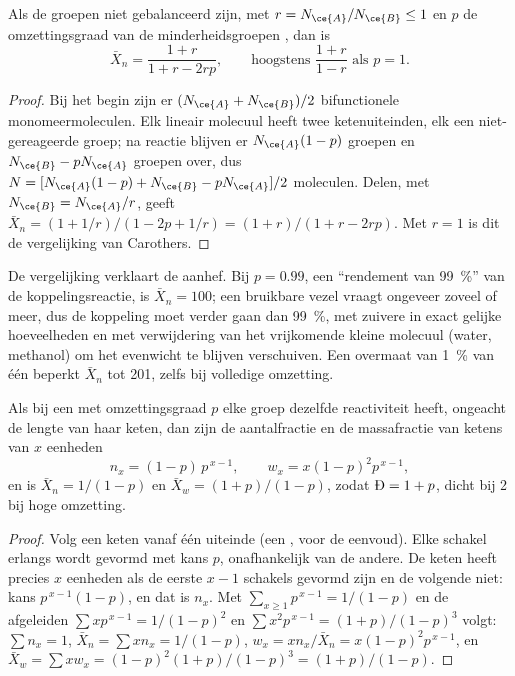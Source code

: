 \begin{corollary}[Onbalans]\label{cor:b2:polymer-synthesis:imbalance}
Als de groepen niet gebalanceerd zijn, met $r = N_{\ce{A}}/N_{\ce{B}} \le 1$ en $p$ de omzettingsgraad van
de minderheidsgroepen , dan is
\begin{equation*}
\bar X_n = \frac{1 + r}{1 + r - 2rp}, \qquad \text{hoogstens } \frac{1+r}{1-r} \text{ als } p = 1.
\end{equation*}
\end{corollary}

\begin{proof}
Bij het begin zijn er $(N_{\ce{A}} + N_{\ce{B}})/2$ bifunctionele monomeermoleculen. Elk lineair
molecuul heeft twee ketenuiteinden, elk een niet-gereageerde groep; na reactie blijven er $N_{\ce{A}}(1-p)$
groepen  en $N_{\ce{B}} - pN_{\ce{A}}$ groepen  over, dus $N = [N_{\ce{A}}(1-p) + N_{\ce{B}} -
pN_{\ce{A}}]/2$ moleculen. Delen, met $N_{\ce{B}} = N_{\ce{A}}/r$, geeft
$\bar X_n = (1 + 1/r)/(1 - 2p + 1/r) = (1+r)/(1 + r - 2rp)$. Met $r = 1$ is dit de vergelijking van Carothers.
\end{proof}

De vergelijking verklaart de aanhef. Bij $p = 0.99$, een ``rendement van 99~\%'' van de koppelingsreactie, is $\bar X_n =
100$; een bruikbare vezel vraagt ongeveer zoveel of meer, dus de koppeling moet verder gaan dan 99~\%, met zuivere 
in exact gelijke hoeveelheden en met verwijdering van het vrijkomende kleine molecuul (water, methanol) om het
evenwicht te blijven verschuiven. Een overmaat van 1~\% van één  beperkt $\bar X_n$ tot 201, zelfs bij volledige omzetting.

\begin{theorem}\label{thm:b2:polymer-synthesis:flory}
Als bij een  met omzettingsgraad $p$ elke groep dezelfde reactiviteit heeft, ongeacht de
lengte van haar keten, dan zijn de aantalfractie en de massafractie van ketens van $x$ eenheden
\begin{equation*}
n_x = (1-p)\,p^{\,x-1}, \qquad w_x = x(1-p)^2 p^{\,x-1},
\end{equation*}
en is $\bar X_n = 1/(1-p)$ en $\bar X_w = (1+p)/(1-p)$, zodat $\text{\DH} = 1 + p$, dicht bij 2 bij hoge
omzetting.
\end{theorem}

\begin{proof}
Volg een keten vanaf één uiteinde (een  , voor de eenvoud). Elke schakel erlangs wordt gevormd met
kans $p$, onafhankelijk van de andere. De keten heeft precies $x$ eenheden als de eerste $x-1$ schakels gevormd zijn
en de volgende niet: kans $p^{\,x-1}(1-p)$, en dat is $n_x$. Met $\sum_{x\ge1} p^{\,x-1} =
1/(1-p)$ en de afgeleiden $\sum x p^{\,x-1} = 1/(1-p)^2$ en $\sum x^2 p^{\,x-1} = (1+p)/(1-p)^3$ volgt:
$\sum n_x = 1$, $\bar X_n = \sum x n_x = 1/(1-p)$, $w_x = x n_x/\bar X_n = x(1-p)^2p^{\,x-1}$, en
$\bar X_w = \sum x w_x = (1-p)^2(1+p)/(1-p)^3 = (1+p)/(1-p)$.
\end{proof}

